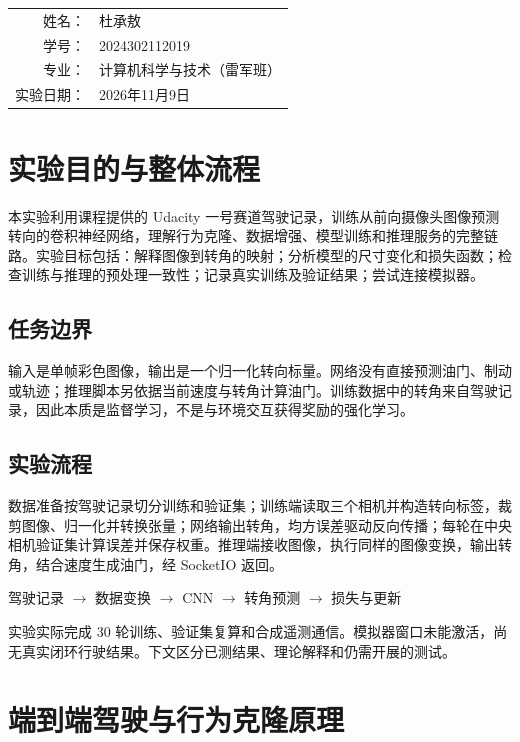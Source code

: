 \documentclass[UTF8,zihao=-4,fontset=windows]{ctexart}
\begin{document}
\begin{titlepage}\centering{}\vfill
{\renewcommand{\arraystretch}{1.8}\begin{tabular}{rl}姓名：&杜承敖\\学号：&2024302112019\\专业：&计算机科学与技术（雷军班）\\实验日期：&2026年11月9日\end{tabular}}\vfill\end{titlepage}
\setcounter{tocdepth}{1}\tableofcontents\newpage
\section{实验目的与整体流程}
本实验利用课程提供的 Udacity 一号赛道驾驶记录，训练从前向摄像头图像预测转向的卷积神经网络，理解行为克隆、数据增强、模型训练和推理服务的完整链路。实验目标包括：解释图像到转角的映射；分析模型的尺寸变化和损失函数；检查训练与推理的预处理一致性；记录真实训练及验证结果；尝试连接模拟器。
\subsection{任务边界}
输入是单帧彩色图像，输出是一个归一化转向标量。网络没有直接预测油门、制动或轨迹；推理脚本另依据当前速度与转角计算油门。训练数据中的转角来自驾驶记录，因此本质是监督学习，不是与环境交互获得奖励的强化学习。
\subsection{实验流程}
数据准备按驾驶记录切分训练和验证集；训练端读取三个相机并构造转向标签，裁剪图像、归一化并转换张量；网络输出转角，均方误差驱动反向传播；每轮在中央相机验证集计算误差并保存权重。推理端接收图像，执行同样的图像变换，输出转角，结合速度生成油门，经 SocketIO 返回。
\begin{center}驾驶记录 $\rightarrow$ 数据变换 $\rightarrow$ CNN $\rightarrow$ 转角预测 $\rightarrow$ 损失与更新\end{center}
实验实际完成 30 轮训练、验证集复算和合成遥测通信。模拟器窗口未能激活，尚无真实闭环行驶结果。下文区分已测结果、理论解释和仍需开展的测试。
\newpage
\section{端到端驾驶与行为克隆原理}
\end{document}

